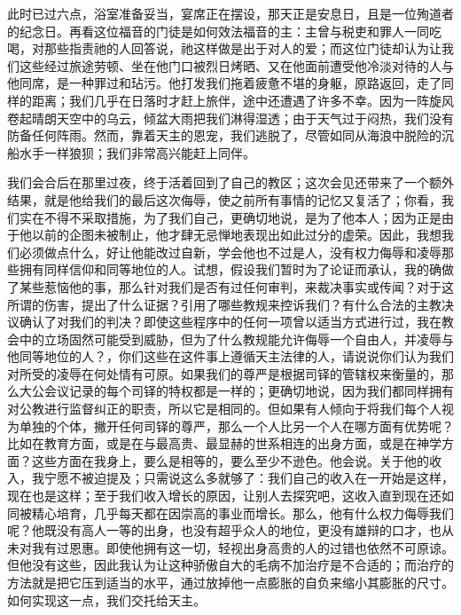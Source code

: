 此时已过六点，浴室准备妥当，宴席正在摆设，那天正是安息日，且是一位殉道者的纪念日。再看这位福音的门徒是如何效法福音的主：主曾与税吏和罪人一同吃喝，对那些指责祂的人回答说，祂这样做是出于对人的爱；而这位门徒却认为让我们这些经过旅途劳顿、坐在他门口被烈日烤晒、又在他面前遭受他冷淡对待的人与他同席，是一种罪过和玷污。他打发我们拖着疲惫不堪的身躯，原路返回，走了同样的距离；我们几乎在日落时才赶上旅伴，途中还遭遇了许多不幸。因为一阵旋风卷起晴朗天空中的乌云，倾盆大雨把我们淋得湿透；由于天气过于闷热，我们没有防备任何阵雨。然而，靠着天主的恩宠，我们逃脱了，尽管如同从海浪中脱险的沉船水手一样狼狈；我们非常高兴能赶上同伴。\par

我们会合后在那里过夜，终于活着回到了自己的教区；这次会见还带来了一个额外结果，就是他给我们的最后这次侮辱，使之前所有事情的记忆又复活了；你看，我们实在不得不采取措施，为了我们自己，更确切地说，是为了他本人；因为正是由于他以前的企图未被制止，他才肆无忌惮地表现出如此过分的虚荣。因此，我想我们必须做点什么，好让他能改过自新，学会他也不过是人，没有权力侮辱和凌辱那些拥有同样信仰和同等地位的人。试想，假设我们暂时为了论证而承认，我的确做了某些惹恼他的事，那么针对我们是否有过任何审判，来裁决事实或传闻？对于这所谓的伤害，提出了什么证据？引用了哪些教规来控诉我们？有什么合法的主教决议确认了对我们的判决？即使这些程序中的任何一项曾以适当方式进行过，我在教会中的立场固然可能受到威胁，但为了什么教规能允许侮辱一个自由人，并凌辱与他同等地位的人？，你们这些在这件事上遵循天主法律的人，请说说你们认为我们对所受的凌辱在何处情有可原。如果我们的尊严是根据司铎的管辖权来衡量的，那么大公会议记录的每个司铎的特权都是一样的；更确切地说，因为我们都同样拥有对公教进行监督纠正的职责，所以它是相同的。但如果有人倾向于将我们每个人视为单独的个体，撇开任何司铎的尊严，那么一个人比另一个人在哪方面有优势呢？比如在教育方面，或是在与最高贵、最显赫的世系相连的出身方面，或是在神学方面？这些方面在我身上，要么是相等的，要么至少不逊色。他会说。关于他的收入，我宁愿不被迫提及；只需说这么多就够了：我们自己的收入在一开始是这样，现在也是这样；至于我们收入增长的原因，让别人去探究吧，这收入直到现在还如同被精心培育，几乎每天都在因崇高的事业而增长。那么，他有什么权力侮辱我们呢？他既没有高人一等的出身，也没有超乎众人的地位，更没有雄辩的口才，也从未对我有过恩惠。即使他拥有这一切，轻视出身高贵的人的过错也依然不可原谅。但他没有这些，因此我认为让这种骄傲自大的毛病不加治疗是不合适的；而治疗的方法就是把它压到适当的水平，通过放掉他一点膨胀的自负来缩小其膨胀的尺寸。如何实现这一点，我们交托给天主。\par

